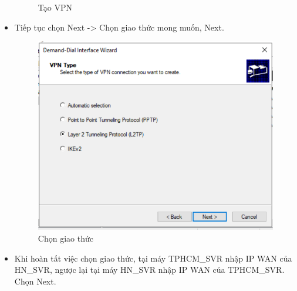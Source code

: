 \begin{itemize}
\begin{figure}[htbp]
            \hfill
            \caption{Tạo VPN}
        \end{figure}
        \item Tiếp tục chọn Next -> Chọn giao thức mong muốn, Next.
\newpage
            \begin{figure}[htbp]
            \centering
            \includegraphics[width=0.6\linewidth]{SiteToSiteImg/conf8.png}
            \caption{Chọn giao thức}
            \end{figure}
        
        \item Khi hoàn tất việc chọn giao thức, tại máy TPHCM\_SVR nhập IP WAN của HN\_SVR, ngược lại tại máy HN\_SVR nhập IP WAN của TPHCM\_SVR. Chọn Next.
        
    \end{itemize}
